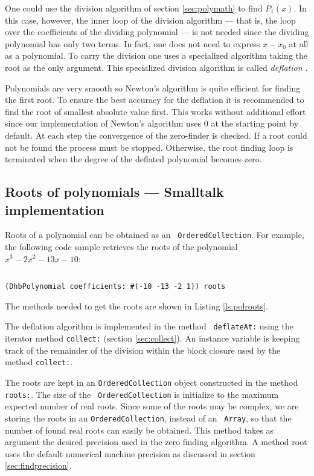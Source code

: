 \documentclass[twoside]{book}
\begin{document}
One could use the division algorithm of section \ref{sec:polymath}
to find $P_1\left(x\right)$. In this case, however, the inner loop
of the division algorithm --- that is, the loop over the
coefficients of the dividing polynomial --- is not needed since
the dividing polynomial has only two terms. In fact, one does not
need to express $x-x_0$ at all as a polynomial. To carry the
division one uses a specialized algorithm taking the root as the
only argument. This specialized division algorithm is called {\sl
deflation} \cite{Press}.

Polynomials are very smooth so Newton's algorithm is quite
efficient for finding the first root. To ensure the best accuracy
for the deflation it is recommended to find the root of smallest
absolute value first. This works without additional effort since
our implementation of Newton's algorithm uses 0 at the starting
point by default. At each step the convergence of the zero-finder
is checked. If a root could not be found the process must be
stopped. Otherwise, the root finding loop is terminated when the
degree of the deflated polynomial becomes zero.

\subsection{Roots of polynomials --- Smalltalk implementation}
Roots of a polynomial can be obtained as an {\tt
OrderedCollection}. For example, the following code sample
retrieves the roots of the polynomial $x^3-2x^2-13x-10$:
\begin{codeExample}
\begin{verbatim}

\end{verbatim}
{\tt (DhbPolynomial coefficients: \#(-10 -13 -2 1)) roots}
\end{codeExample}
The methods needed to get the roots are shown in Listing
\ref{ls:polroots}.

The deflation algorithm is implemented in the method {\tt
deflateAt:} using the iterator method {\tt collect:} (\cf section
\ref{sec:collect}). An instance variable is keeping track of the
remainder of the division within the block closure used by the
method {\tt collect:}.

The roots are kept in an {\tt OrderedCollection} object
constructed in the method {\tt roots:}. The size of the {\tt
OrderedCollection} is initialize to the maximum expected number of
real roots. Since some of the roots may be complex, we are storing
the roots in an {\tt OrderedCollection}, instead of an {\tt
Array}, so that the number of found real roots can easily be
obtained. This method takes as argument the desired precision used
in the zero finding algorithm. A method root uses the default
numerical machine precision as discussed in section
\ref{sec:findprecision}.
\end{document}
